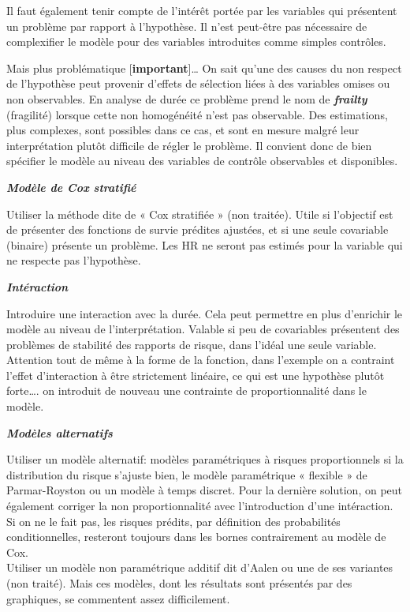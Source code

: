 \documentclass[
  12pt,
  letterpaper,
  DIV=11,
  numbers=noendperiod,
  onepage,
  openany]{scrreprt}
\begin{document}
Il faut également tenir compte de l'intérêt portée par les variables qui
présentent un problème par rapport à l'hypothèse. Il n'est peut-être pas
nécessaire de complexifier le modèle pour des variables introduites
comme simples contrôles.

Mais plus problématique {[}\textbf{important}{]}\ldots{} On sait qu'une
des causes du non respect de l'hypothèse peut provenir d'effets de
sélection liées à des variables omises ou non observables. En analyse de
durée ce problème prend le nom de \textbf{\emph{frailty}} (fragilité)
lorsque cette non homogénéité n'est pas observable. Des estimations,
plus complexes, sont possibles dans ce cas, et sont en mesure malgré
leur interprétation plutôt difficile de régler le problème. Il convient
donc de bien spécifier le modèle au niveau des variables de contrôle
observables et disponibles.

\textbf{\emph{Modèle de Cox stratifié}}

Utiliser la méthode dite de « Cox stratifiée » (non traitée). Utile si
l'objectif est de présenter des fonctions de survie prédites ajustées,
et si une seule covariable (binaire) présente un problème. Les HR ne
seront pas estimés pour la variable qui ne respecte pas l'hypothèse.

\textbf{\emph{Intéraction}}

Introduire une interaction avec la durée. Cela peut permettre en plus
d'enrichir le modèle au niveau de l'interprétation. Valable si peu de
covariables présentent des problèmes de stabilité des rapports de
risque, dans l'idéal une seule variable. Attention tout de même à la
forme de la fonction, dans l'exemple on a contraint l'effet
d'interaction à être strictement linéaire, ce qui est une hypothèse
plutôt forte\ldots. on introduit de nouveau une contrainte de
proportionnalité dans le modèle.

\textbf{\emph{Modèles alternatifs}}

Utiliser un modèle alternatif: modèles paramétriques à risques
proportionnels si la distribution du risque s'ajuste bien, le modèle
paramétrique « flexible » de Parmar-Royston ou un modèle à temps
discret. Pour la dernière solution, on peut également corriger la non
proportionnalité avec l'introduction d'une intéraction. Si on ne le fait
pas, les risques prédits, par définition des probabilités
conditionnelles, resteront toujours dans les bornes contrairement au
modèle de Cox.\\
Utiliser un modèle non paramétrique additif dit d'Aalen ou une de ses
variantes (non traité). Mais ces modèles, dont les résultats sont
présentés par des graphiques, se commentent assez difficilement.
\end{document}

